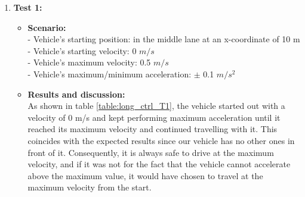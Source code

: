 \begin{enumerate}
    \item \textbf{Test 1:}
        \begin{itemize}
            \item \textbf{Scenario:}
            \\
            - Vehicle’s starting position: in the middle lane at an x-coordinate of 10 m
            \\
            - Vehicle’s starting velocity: 0 \(m/s\)
            \\
            - Vehicle’s maximum velocity: 0.5 \(m/s\)
            \\
            - Vehicle’s maximum/minimum acceleration: \(\pm\) 0.1 \(m/s^{2}\)

            \item \textbf{Results and discussion:} \\
            As shown in table \ref{table:long_ctrl_T1}, the vehicle started out with a velocity of 0 m/s and kept performing maximum acceleration until it reached its maximum velocity and continued travelling with it. This coincides with the expected results since our vehicle has no other ones in front of it. Consequently, it is always safe to drive at the maximum velocity, and if it was not for the fact that the vehicle cannot accelerate above the maximum value, it would have chosen to travel at the maximum velocity from the start.
            

\end{itemize}
\end{enumerate}
